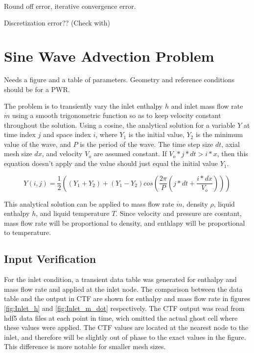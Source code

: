 \documentclass{mc2015}
\begin{document}
Round off error, iterative convergence error.

Discretization error?? (Check with)

\section{Sine Wave Advection Problem}

Needs a figure and a table of parameters. Geometry and reference conditions
should be for a PWR.

The problem is to transiently vary the inlet enthalpy $h$ and inlet mass flow
rate $\dot{m}$ using a smooth trigonometric function so as to keep velocity
constant throughout the solution. Using a cosine, the analytical solution for a
variable $Y$ at time index $j$ and space index $i$, where $Y_{1}$ is the initial
value, $Y_{2}$ is the minimum value of the wave, and $P$ is the period of the
wave. The time step size $dt$, axial mesh size $dx$, and velocity $V_{o}$ are
assumed constant. If $V_{o}*j*dt>i*x$, then this equation doesn't apply and the
value should just equal the initial value $Y_{1}$.

\begin{equation}
	Y(i,j) = \frac{1}{2} \left( 
			(Y_{1}+Y_{2}) + (Y_{1}-Y_{2}) cos\left(
				\frac{2 \pi}{P} \left( j*dt + \frac{i*dx}{V_{o}} \right)
				\right)
			\right)
\end{equation}

This analytical solution can be applied to mass flow rate $\dot{m}$,
density $\rho$, liquid enthalpy $h$, and liquid temperature $T$. Since velocity
and pressure are cosntant, mass flow rate will be proportional to density, and
enthlapy will be proportional to temperature.

\subsection{Input Verification}

For the inlet condition, a transient data table was generated for enthalpy and
mass flow rate and applied at the inlet node. The comparison between the data
table and the output in CTF are shown for enthalpy and mass flow rate in figures
\ref{fig:Inlet_h} and \ref{fig:Inlet_m_dot} respectively. The CTF output was
read from hdf5 data files at each point in time, wich omitted the actual ghost
cell where these values were applied. The CTF values are located at the nearest
node to the inlet, and therefore will be slightly out of phase to the exact
values in the figure. This difference is more notable for smaller mesh sizes.
\end{document}
